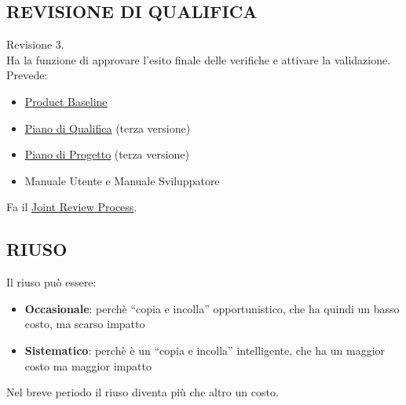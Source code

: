 		\subsection{REVISIONE DI QUALIFICA}  \label{RQ}
		Revisione 3. \\
		Ha la funzione di approvare l’esito finale delle verifiche e attivare la validazione.
		Prevede:
		\begin{itemize}
			\item \underline{\hyperref[productbaseline]{Product Baseline}}
			\item \underline{\hyperref[pianoqualifica]{Piano di Qualifica}} (terza versione)
			\item \underline{\hyperref[piano]{Piano di Progetto}} (terza versione)
			\item Manuale Utente e Manuale Sviluppatore
		\end{itemize}
		Fa il \underline{\hyperref[joint]{Joint Review Process}}.


		\subsection{RIUSO}  \label{riuso}
		Il riuso può essere:
			\begin{itemize}
				\item \textbf{Occasionale}: perchè ``copia e incolla'' opportunistico, che ha quindi un basso costo, ma scarso impatto
				\item \textbf{Sistematico}: perchè è un ``copia e incolla'' intelligente, che ha un maggior costo ma maggior impatto
			\end{itemize}
		Nel breve periodo il riuso diventa più che altro un costo.


